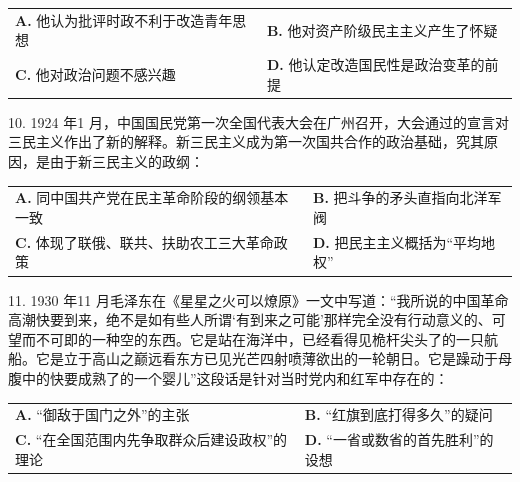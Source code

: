 \documentclass[UTF8,11pt]{ctexart}
\begin{document}
\begin{center}\begin{tabular}{>{\raggedright\arraybackslash}p{\dimexpr(\linewidth-4\tabcolsep)/2\relax}>{\raggedright\arraybackslash}p{\dimexpr(\linewidth-4\tabcolsep)/2\relax}}
\textbf{A.} 他认为批评时政不利于改造青年思想 & \textbf{B.} 他对资产阶级民主主义产生了怀疑\\[.35em]
\textbf{C.} 他对政治问题不感兴趣 & \textbf{D.} 他认定改造国民性是政治变革的前提\\[.35em]\end{tabular}\end{center}

10. 1924 年1 月，中国国民党第一次全国代表大会在广州召开，大会通过的宣言对三民主义作出了新的解释。新三民主义成为第一次国共合作的政治基础，究其原因，是由于新三民主义的政纲：


\begin{center}\begin{tabular}{>{\raggedright\arraybackslash}p{\dimexpr(\linewidth-4\tabcolsep)/2\relax}>{\raggedright\arraybackslash}p{\dimexpr(\linewidth-4\tabcolsep)/2\relax}}
\textbf{A.} 同中国共产党在民主革命阶段的纲领基本一致 & \textbf{B.} 把斗争的矛头直指向北洋军阀\\[.35em]
\textbf{C.} 体现了联俄、联共、扶助农工三大革命政策 & \textbf{D.} 把民主主义概括为“平均地权”\\[.35em]\end{tabular}\end{center}

11. 1930 年11 月毛泽东在《星星之火可以燎原》一文中写道：“我所说的中国革命高潮快要到来，绝不是如有些人所谓‘有到来之可能’那样完全没有行动意义的、可望而不可即的一种空的东西。它是站在海洋中，已经看得见桅杆尖头了的一只航船。它是立于高山之巅远看东方已见光芒四射喷薄欲出的一轮朝日。它是躁动于母腹中的快要成熟了的一个婴儿”这段话是针对当时党内和红军中存在的：


\begin{center}\begin{tabular}{>{\raggedright\arraybackslash}p{\dimexpr(\linewidth-4\tabcolsep)/2\relax}>{\raggedright\arraybackslash}p{\dimexpr(\linewidth-4\tabcolsep)/2\relax}}
\textbf{A.} “御敌于国门之外”的主张 & \textbf{B.} “红旗到底打得多久”的疑问\\[.35em]
\textbf{C.} “在全国范围内先争取群众后建设政权”的理论 & \textbf{D.} “一省或数省的首先胜利”的设想\\[.35em]\end{tabular}\end{center}
\end{document}
